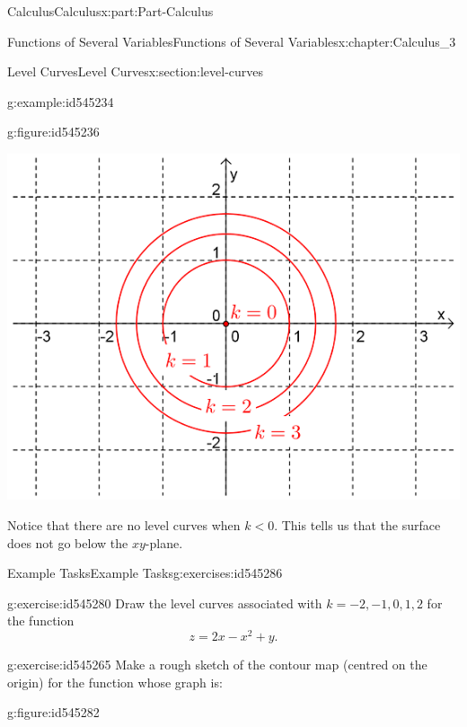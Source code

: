 \documentclass[oneside,10pt,]{book}
\numberwithin{equation}{section}
\newcommand{\lt}{<}
\begin{document}
\begin{partptx}{Calculus}{}{Calculus}{}{}{x:part:Part-Calculus}
\begin{chapterptx}{Functions of Several Variables}{}{Functions of Several Variables}{}{}{x:chapter:Calculus_3}
\begin{sectionptx}{Level Curves}{}{Level Curves}{}{}{x:section:level-curves}
\begin{example}{}{g:example:id545234}
\begin{figureptx}{}{g:figure:id545236}{}
\begin{image}{0.125}{0.75}{0.125}%
\includegraphics[width=\linewidth]{./Calculus/Images/3/2_example9.png}
\end{image}%
\tcblower
\end{figureptx}%
 Notice that there are no level curves when \(k\lt 0\). This tells us that the surface does not go below the \(xy\)-plane.%
\end{example}
%
%
\typeout{************************************************}
\typeout{************************************************}
%
\begin{exercises-subsection-numberless}{Example Tasks}{}{Example Tasks}{}{}{g:exercises:id545286}
\begin{divisionexercise}{1}{}{}{g:exercise:id545280}%
Draw the level curves associated with \(k=-2,-1,0,1,2\) for the function%
\begin{equation*}
z=2x-x^2+y\text{.}
\end{equation*}
%
\end{divisionexercise}%
\begin{divisionexercise}{2}{}{}{g:exercise:id545265}%
Make a rough sketch of the contour map (centred on the origin) for the function whose graph is:%
\begin{figureptx}{}{g:figure:id545282}{}%
\begin{image}{0.125}{0.75}{0.125}%

\end{image}
\end{figureptx}
\end{divisionexercise}
\end{exercises-subsection-numberless}
\end{sectionptx}
\end{chapterptx}
\end{partptx}
\end{document}
